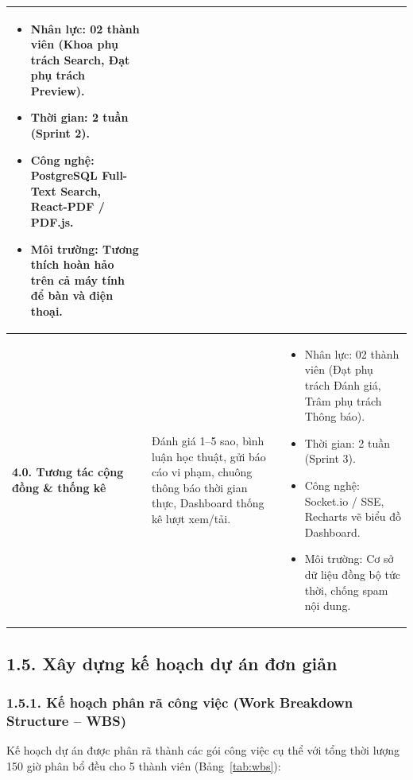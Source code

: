 \begin{table}[htbp]
\begin{tabularx}{\textwidth}{|p{3.2cm}|X|X|}
\begin{itemize}[leftmargin=*,noitemsep,topsep=0pt]
    \item Nhân lực: 02 thành viên (Khoa phụ trách Search, Đạt phụ trách Preview).
    \item Thời gian: 2 tuần (Sprint 2).
    \item Công nghệ: PostgreSQL Full-Text Search, React-PDF / PDF.js.
    \item Môi trường: Tương thích hoàn hảo trên cả máy tính để bàn và điện thoại.
\end{itemize} \\
\hline
\textbf{4.0. Tương tác cộng đồng \& thống kê} & Đánh giá 1--5 sao, bình luận học thuật, gửi báo cáo vi phạm, chuông thông báo thời gian thực, Dashboard thống kê lượt xem/tải. & 
\begin{itemize}[leftmargin=*,noitemsep,topsep=0pt]
    \item Nhân lực: 02 thành viên (Đạt phụ trách Đánh giá, Trâm phụ trách Thông báo).
    \item Thời gian: 2 tuần (Sprint 3).
    \item Công nghệ: Socket.io / SSE, Recharts vẽ biểu đồ Dashboard.
    \item Môi trường: Cơ sở dữ liệu đồng bộ tức thời, chống spam nội dung.
\end{itemize} \\
\hline
\end{tabularx}
\end{table}

\subsection{1.5. Xây dựng kế hoạch dự án đơn giản}

\subsubsection{1.5.1. Kế hoạch phân rã công việc (Work Breakdown Structure -- WBS)}
Kế hoạch dự án được phân rã thành các gói công việc cụ thể với tổng thời lượng 150 giờ phân bổ đều cho 5 thành viên (Bảng~\ref{tab:wbs}):

